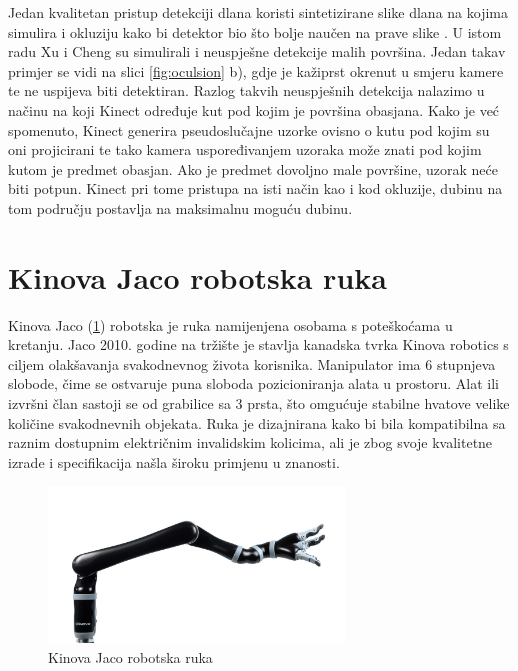 \documentclass[times, utf8, diplomski, numeric]{fer}
\begin{document}
Jedan kvalitetan pristup detekciji dlana koristi sintetizirane slike dlana na kojima simulira i okluziju kako bi detektor bio što bolje naučen na prave slike \citep{xu2013efficient}. U istom radu Xu i Cheng su simulirali i neuspješne detekcije malih površina. Jedan takav primjer se vidi na slici \ref{fig:oculsion} b), gdje je kažiprst okrenut u smjeru kamere te ne uspijeva biti detektiran. Razlog takvih neuspješnih detekcija nalazimo u načinu na koji Kinect određuje kut pod kojim je površina obasjana. Kako je već spomenuto, Kinect generira pseudoslučajne uzorke ovisno o kutu pod kojim su oni projicirani te tako kamera uspoređivanjem uzoraka može znati pod kojim kutom je predmet obasjan. Ako je predmet dovoljno male površine, uzorak neće biti potpun. Kinect pri tome pristupa na isti način kao i kod okluzije, dubinu na tom području postavlja na maksimalnu moguću dubinu.

\newpage
\section{Kinova Jaco robotska ruka}
Kinova Jaco (\ref{JACO2}) robotska je ruka namijenjena osobama s poteškoćama u kretanju.
Jaco 2010. godine na tržište je stavlja kanadska tvrka Kinova robotics s ciljem olakšavanja svakodnevnog života korisnika.
Manipulator ima 6 stupnjeva slobode, čime se ostvaruje puna sloboda pozicioniranja alata u prostoru.
Alat ili izvršni član sastoji se od grabilice sa 3 prsta, što omgućuje stabilne hvatove velike količine svakodnevnih objekata.
Ruka je dizajnirana kako bi bila kompatibilna sa raznim dostupnim električnim invalidskim kolicima, ali je zbog svoje kvalitetne izrade i specifikacija našla široku primjenu u znanosti.

\begin{figure}[h!]
\centering
\includegraphics[width = 0.7\textwidth]{JACO2}
\caption{Kinova Jaco robotska ruka} \label{JACO2}
\end{figure}
\end{document}
